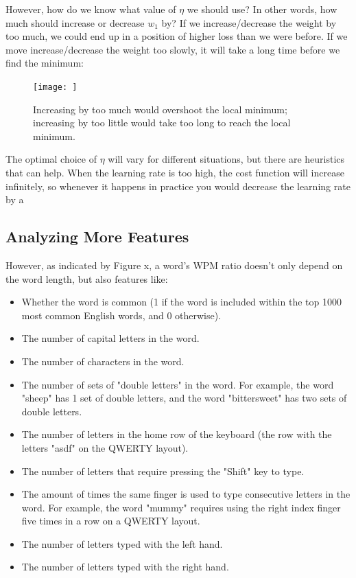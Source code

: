 \documentclass[12pt, demo]{article}
\begin{document}
However, how do we know what value of $\eta$ we should use? In other words, how much should increase or decrease $w_1$ by? If we increase/decrease the weight by too much, we could end up in a position of higher loss than we were before. If we move increase/decrease the weight too slowly, it will take a long time before we find the minimum:

\begin{figure}[hbt!]
	\caption{Increasing by too much would overshoot the local minimum; increasing by too little would take too long to reach the local minimum.}
	\texttt{[image: ]}
\end{figure}

The optimal choice of $\eta$ will vary for different situations, but there are heuristics that can help. When the learning rate is too high, the cost function will increase infinitely, so whenever it happens in practice you would decrease the learning rate by a %

\subsection*{Analyzing More Features}
However, as indicated by Figure x, a word's WPM ratio doesn't only depend on the word length, but also features like:

\begin{itemize}
	\item Whether the word is common (1 if the word is included within the top 1000 most common English words, and 0 otherwise).
	\item The number of capital letters in the word.
	\item The number of characters in the word.
	\item The number of sets of "double letters" in the word. For example, the word "sheep" has 1 set of double letters, and the word "bittersweet" has two sets of double letters.
	\item The number of letters in the home row of the keyboard (the row with the letters "asdf" on the QWERTY layout).
	\item The number of letters that require pressing the "Shift" key to type.
	\item The amount of times the same finger is used to type consecutive letters in the word. For example, the word "mummy" requires using the right index finger five times in a row on a QWERTY layout.
	\item The number of letters typed with the left hand.
	\item The number of letters typed with the right hand.
\end{itemize}
\end{document}
